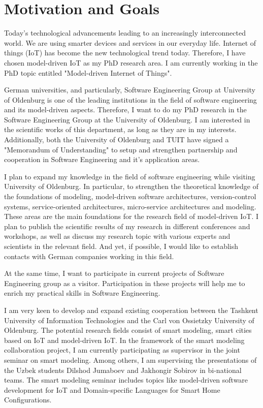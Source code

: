 \documentclass[10pt, oneside]{article}
\begin{document}
\section{Motivation and Goals}
Today’s technological advancements leading to an increasingly interconnected world. We are using smarter devices and services in our everyday life. Internet of things (IoT) has become the new technological trend today. Therefore, I have chosen model-driven IoT as my PhD research area. I am currently working in the PhD topic entitled "Model-driven Internet of Things".

German universities, and particularly, Software Engineering Group at University of Oldenburg is one of the leading institutions in the field of software engineering and its model-driven aspects. Therefore, I want to do my PhD research in the Software Engineering Group at the University of Oldenburg. I am interested in the scientific works of this department, as long as they are in my interests. Additionally, both the University of Oldenburg and TUIT have signed a "Memorandum of Understanding" to setup and strengthen partnership and cooperation in Software 
Engineering and it’s application areas. 

I plan to expand my knowledge in the field of software engineering while visiting University of Oldenburg. In particular, to strengthen the theoretical knowledge of the foundations of modeling, model-driven software architectures, version-control systems, service-oriented architectures, micro-service architectures and modeling. These areas are the main foundations for the research field of model-driven IoT. I plan to publish the scientific results of my research in different conferences and workshops, as well as discuss my research topic with various experts and scientists in the relevant field. And yet, if possible, I would like to establish contacts with German companies working in this field.

At the same time, I want to participate in current projects of Software Engineering group as a visitor. Participation in these projects will help me to enrich my practical skills in Software Engineering.

I am very keen to develop and expand existing cooperation between the Tashkent University of Information Technologies and the Carl von Ossietzky University of Oldenburg. The potential research fields consist of smart modeling, smart cities based on IoT and model-driven IoT. In the framework of the smart modeling collaboration project, I am currently participating as supervisor in the joint seminar on smart modeling. Among others, I am supervising the presentations of the Uzbek students Dilshod Jumaboev and Jakhongir Sobirov in bi-national teams. The smart modeling seminar includes topics like model-driven software development for IoT and Domain-specific Languages for Smart Home Configurations.
\end{document}
